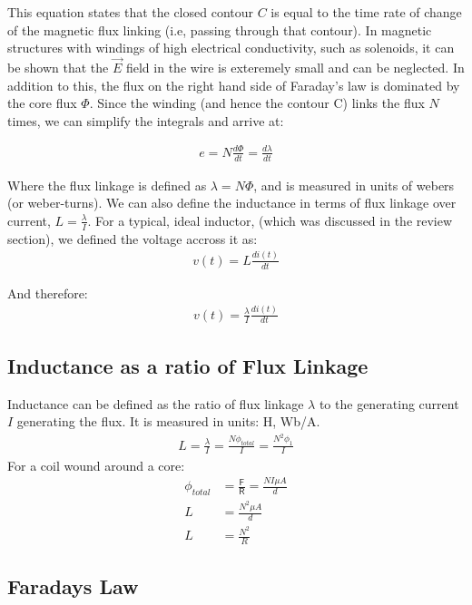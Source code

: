 \documentclass{book}
\begin{document}
 This equation states that the closed contour $C$ is equal to the time rate of change of the magnetic flux linking (i.e, passing through that contour). In magnetic structures with windings of high electrical conductivity, such as solenoids, it can be shown that the $\vec{E}$ field in the wire is exteremely small and can be neglected. In addition to this, the flux on the right hand side of Faraday's law is dominated by the core flux $\Phi$. Since the winding (and hence the contour C) links the flux $N$ times, we can simplify the integrals and arrive at:
 
 \begin{align*}
 	e = N\frac{d\Phi}{dt} = \frac{d\lambda}{dt}
 \end{align*}
 
 Where the flux linkage is defined as $\lambda = N \Phi$, and is measured in units of webers (or weber-turns). We can also define the inductance in terms of flux linkage over current, $L = \frac{\lambda}{I}$. For a typical, ideal inductor, (which was discussed in the review section), we defined the voltage accross it as:
 \begin{align*}
 	v(t) = L \frac{di(t)}{dt}
 \end{align*}
 
 And therefore:
 \begin{align*}
 	v(t) = \frac{\lambda}{I} \frac{di(t)}{dt}
 \end{align*}
 
 
 \subsection{Inductance as a ratio of Flux Linkage}
 
 Inductance can be defined as the ratio of flux linkage $\lambda$ to the generating current $I$ generating the flux. It is measured in units: H, Wb/A. 
 \begin{align*}
 	L = \frac{\lambda}{I} = \frac{N \phi_{total}}{I} = \frac{N^2 \phi_1}{I}
 \end{align*}
 For a coil wound around a core:
 \begin{align*}
 	\phi_{total} &= \frac{\mathsf{F}}{\mathsf{R}} = \frac{NI \mu A}{d} \\
 	L &= \frac{N^2 \mu A}{d} \\
 	L &= \frac{N^2}{R}
 \end{align*}
 \subsection{Faradays Law}
 
\end{document}
